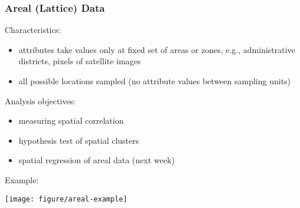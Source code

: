 \documentclass[10pt]{beamer}\usepackage[]{graphicx}\usepackage[]{color}
\makeatletter
\newenvironment{kframe}{%
 \def\at@end@of@kframe{}%
 \ifinner\ifhmode%
  \def\at@end@of@kframe{\end{minipage}}%
  \begin{minipage}{\columnwidth}%
 \fi\fi%
 \def\FrameCommand##1{\hskip\@totalleftmargin \hskip-\fboxsep
 \colorbox{shadecolor}{##1}\hskip-\fboxsep
     \hskip-\linewidth \hskip-\@totalleftmargin \hskip\columnwidth}%
 \MakeFramed {\advance\hsize-\width
   \@totalleftmargin\z@ \linewidth\hsize
   \@setminipage}}%
 {\par\unskip\endMakeFramed%
 \at@end@of@kframe}
\newenvironment{knitrout}{}{} %
\newcommand{\bitemize}{\begin{itemize}}
\newcommand{\eitemize}{\end{itemize}}
\newcommand{\bblock}{\begin{block}}
\newcommand{\eblock}{\end{block}}
\makeatother
\begin{document}
\begin{frame}

\frametitle{Areal (Lattice) Data}
\bblock{Characteristics:}
\begin{itemize}
\item attributes take values only at fixed set of areas or zones, e.g., administrative districts, pixels of satellite images
\item all possible locations sampled (no attribute values between sampling units)	
\end{itemize}
\eblock

\bblock{Analysis objectives:}
\begin{itemize}
\item measuring spatial correlation 
\item hypothesis test of spatial clusters 
\item spatial regression of areal data (next week)
\end{itemize}
\eblock

\bblock{Example:}
\vspace{-2.0cm}

\begin{knitrout}
\color{fgcolor}\begin{kframe}


{\ttfamily\noindent\itshape\color{messagecolor}{\#\# Loading required package: RColorBrewer}}\end{kframe}

{\centering \texttt{[image: figure/areal-example]} 

}



\end{knitrout}

\eblock
\end{frame}


\end{document}
